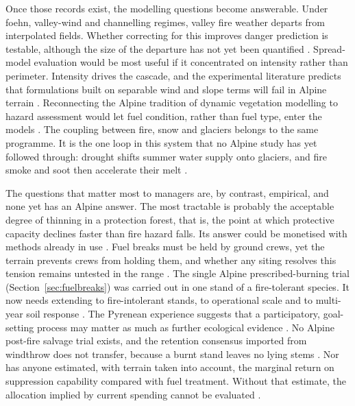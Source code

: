 \documentclass[11pt,a4paper]{article}
\begin{document}
Once those records exist, the modelling questions become answerable. Under foehn, valley-wind and channelling regimes, valley fire weather departs from interpolated fields. Whether correcting for this improves danger prediction is testable, although the size of the departure has not yet been quantified \citep{ozaki_impact_2022, sharples_overview_2009}. Spread-model evaluation would be most useful if it concentrated on intensity rather than perimeter. Intensity drives the cascade, and the experimental literature predicts that formulations built on separable wind and slope terms will fail in Alpine terrain \citep{malanchini_modeling_2025, hayajneh_wind_2026}. Reconnecting the Alpine tradition of dynamic vegetation modelling to hazard assessment would let fuel condition, rather than fuel type, enter the models \citep{schumacher_relative_2006, hillebrand_contrasting_2023, muller_towards_2020}. The coupling between fire, snow and glaciers belongs to the same programme. It is the one loop in this system that no Alpine study has yet followed through: drought shifts summer water supply onto glaciers, and fire smoke and soot then accelerate their melt \citep{leone_20222023_2026, aubrywake_fire_2022, koshkin_wildfire_2022}.

The questions that matter most to managers are, by contrast, empirical, and none yet has an Alpine answer. The most tractable is probably the acceptable degree of thinning in a protection forest, that is, the point at which protective capacity declines faster than fire hazard falls. Its answer could be monetised with methods already in use \citep{costa_biological_2021, accastello_asforesee_2019}. Fuel breaks must be held by ground crews, yet the terrain prevents crews from holding them, and whether any siting resolves this tension remains untested in the range \citep{ortega_modeling_2024}. The single Alpine prescribed-burning trial (Section~\ref{sec:fuelbreaks}) was carried out in one stand of a fire-tolerant species. It now needs extending to fire-intolerant stands, to operational scale and to multi-year soil response \citep{gamba_prescribed_2025}. The Pyrenean experience suggests that a participatory, goal-setting process may matter as much as further ecological evidence \citep{oliveres_path_2025}. No Alpine post-fire salvage trial exists, and the retention consensus imported from windthrow does not transfer, because a burnt stand leaves no lying stems \citep{costa_biological_2021, seben_impact_2024}. Nor has anyone estimated, with terrain taken into account, the marginal return on suppression capability compared with fuel treatment. Without that estimate, the allocation implied by current spending cannot be evaluated \citep{cardil_assessing_2025, brodie_forest_2024, muller_forest_2020}.
\end{document}
